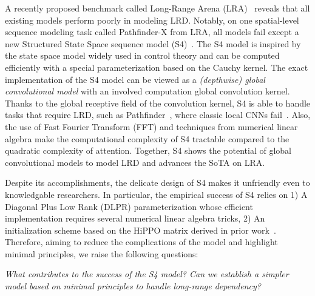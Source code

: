 A recently proposed benchmark called Long-Range Arena (LRA)~\citep{tay2020long} reveals that all existing models perform poorly in modeling LRD. Notably, on one spatial-level sequence modeling task called Pathfinder-X from LRA, all models fail except a new Structured State Space sequence model (S4)~\citep{gu2021efficiently}. The S4 model is inspired by the state space model widely used in control theory and can be computed efficiently with a special parameterization based on the Cauchy kernel. The exact implementation of the S4 model can be viewed as a \emph{(depthwise) global convolutional model} with an involved computation global convolution kernel. Thanks to the global receptive field of the convolution kernel, S4 is able to handle tasks that require LRD, such as Pathfinder~\citep{tay2020long}, where classic local CNNs fail~\citep{linsley2018learning,kim2019disentangling}. Also, the use of Fast Fourier Transform (FFT) and techniques from numerical linear algebra make the computational complexity of S4 tractable compared to the quadratic complexity of attention. Together, S4 shows the potential of global convolutional models to model LRD and advances the SoTA on LRA.

Despite its accomplishments, the delicate design of S4 makes it unfriendly even to knowledgable researchers. In particular, the empirical success of S4 relies on 1) A Diagonal Plus Low Rank (DLPR) parameterization whose efficient implementation requires several numerical linear algebra tricks, 2) An initialization scheme based on the HiPPO matrix derived in prior work~\citep{gu2020hippo}. Therefore, aiming to reduce the complications of the model and highlight minimal principles, we raise the following questions:

\begin{center}
\emph{What contributes to the success of the S4 model? Can we establish a simpler model based on minimal principles to handle long-range dependency?}
\end{center}

